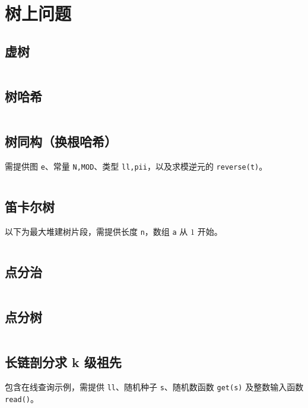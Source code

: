 \section{树上问题}
				\subsection{虚树}
					\inputminted{cpp}{sections/Tree/assets/tree/虚树.cpp}
				\subsection{树哈希}
					\inputminted{cpp}{sections/Tree/assets/tree/TreeHash.cpp}
				\subsection{树同构（换根哈希）}
					需提供图 \texttt{e}、常量 \texttt{N,MOD}、类型 \texttt{ll,pii}，以及求模逆元的 \texttt{reverse(t)}。
					\inputminted{cpp}{sections/Tree/assets/tree/树同构.cpp}
				\subsection{笛卡尔树}
					以下为最大堆建树片段，需提供长度 \texttt{n}，数组 \texttt{a} 从 $1$ 开始。
					\inputminted{cpp}{sections/Tree/assets/tree/笛卡尔树.cpp}
				\subsection{点分治}
					\inputminted{cpp}{sections/Tree/assets/tree/点分治.cpp}
				\subsection{点分树}
					\inputminted{cpp}{sections/Tree/assets/tree/点分树.cpp}
				\subsection{长链剖分求 k 级祖先}
					包含在线查询示例，需提供 \texttt{ll}、随机种子 \texttt{s}、随机数函数 \texttt{get(s)} 及整数输入函数 \texttt{read()}。
					\inputminted{cpp}{sections/Tree/assets/tree/长链剖分.cpp}
